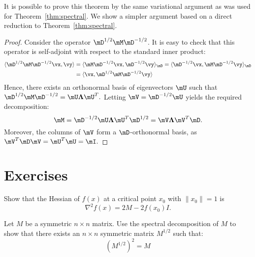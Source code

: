 It is possible to prove this theorem by the same variational argument as was used for Theorem~\ref{thm:spectral}. We show a simpler argument based on a direct reduction to Theorem~\ref{thm:spectral}. 
\begin{proof}
Consider the operator $\mD^{1/2} \mM \mD^{-1/2}$. It is easy to check that this operator is self-adjoint with respect to the standard inner product:
\begin{align*}
\langle \mD^{1/2} \mM \mD^{-1/2} \vx, \vy \rangle &=  \langle \mM \mD^{-1/2} \vx, \mD^{-1/2} \vy \rangle_{\mD} = \langle  \mD^{-1/2} \vx, \mM \mD^{-1/2} \vy \rangle_{\mD} \\ &= \langle \vx,  \mD^{1/2} \mM \mD^{-1/2} \vy \rangle
\end{align*}
Hence, there exists an orthonormal basis of eigenvectors $\mU$ such that
$
\mD^{1/2} \mM \mD^{-1/2} = \mU \mathbf{\Lambda} \mU^T.
$
Letting $\mV=\mD^{-1/2} \mU $ yields the required decomposition:
$$
\mM = \mD^{-1/2}  \mU \mathbf{\Lambda} \mU^T \mD^{1/2} = \mV \mathbf{\Lambda} \mV^T \mD.
$$
Moreover, the columns of $\mV$ form a $\mD$-orthonormal basis, as $\mV^T \mD \mV = \mU^T \mU = \mI.$
\end{proof}


\section{Exercises}

\begin{exercise}
Show that the Hessian of $f(x)$ at a critical point $x_0$ with  $\|x_0\| = 1$ is
$$
\nabla^2 f(x) = 2M - 2 f(x_0) I.
$$
\end{exercise}


\begin{exercise}
Let $M$ be a symmetric $n\times n$ matrix. Use the spectral decomposition of $M$ to show that there exists an $n \times n$ symmetric matrix $M^{1/2}$ such that:
\[
	\left(M^{1/2}\right)^2 = M
\]
\end{exercise}

